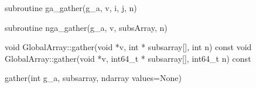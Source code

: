 \documentclass[12pt]{article}
\begin{document}
\begin{f2dapi}
\begin{fcode}
subroutine ga_gather(g_a, v, i, j, n)
\end{fcode}
\begin{funcargs}
\end{funcargs}
\end{f2dapi}
\begin{fapi}
\begin{fcode}
subroutine nga_gather(g_a, v, subsArray, n)
\end{fcode}
\begin{funcargs}
\end{funcargs}
\end{fapi}

\begin{cxxapi}
\begin{cxxcode}
void GlobalArray::gather(void *v, int * subsarray[], int n) const
void GlobalArray::gather(void *v, int64_t * subsarray[], int64_t n) const
\end{cxxcode}
\begin{funcargs}
\end{funcargs}
\end{cxxapi}

\begin{pyapi}
\begin{pycode}
gather(int g_a, subsarray, ndarray values=None)
\end{pycode}
\end{pyapi}
\end{document}
